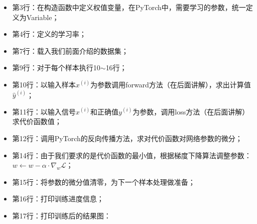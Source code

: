 \documentclass[UTF8]{article}
\begin{document}
\begin{itemize}
\item 第3行：在构造函数中定义权值变量，在PyTorch中，需要学习的参数，统一定义为Variable；
\item 第4行：定义的学习率；
\item 第7行：载入我们前面介绍的数据集；
\item 第9行：对于每个样本执行10$\sim$16行；
\item 第10行：以输入样本$x^{(i)}$为参数调用forward方法（在后面讲解），求出计算值$\hat{y}^{(i)}$；
\item 第11行：以输入信号$x^{(i)}$和正确值$y^{(i)}$为参数，调用loss方法（在后面讲解）求代价函数值；
\item 第12行：调用PyTorch的反向传播方法，求对代价函数对网络参数的微分；
\item 第14行：由于我们要求的是代价函数的最小值，根据梯度下降算法调整参数：$w \leftarrow w - \alpha \cdot \nabla_{w} \mathcal{L}$；
\item 第15行：将参数的微分值清零，为下一个样本处理做准备；
\item 第16行：打印训练进度信息；
\item 第17行：打印训练后的结果图：


\end{itemize}
\end{document}
